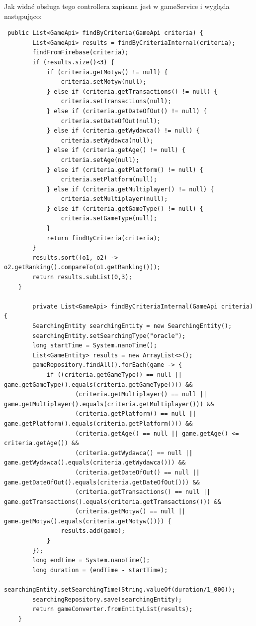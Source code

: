 Jak widać obsługa tego controllera zapisana jest w gameService i wygląda następująco:
\begin{lstlisting}
 public List<GameApi> findByCriteria(GameApi criteria) {
        List<GameApi> results = findByCriteriaInternal(criteria);
        findFromFirebase(criteria);
        if (results.size()<3) {
            if (criteria.getMotyw() != null) {
                criteria.setMotyw(null);
            } else if (criteria.getTransactions() != null) {
                criteria.setTransactions(null);
            } else if (criteria.getDateOfOut() != null) {
                criteria.setDateOfOut(null);
            } else if (criteria.getWydawca() != null) {
                criteria.setWydawca(null);
            } else if (criteria.getAge() != null) {
                criteria.setAge(null);
            } else if (criteria.getPlatform() != null) {
                criteria.setPlatform(null);
            } else if (criteria.getMultiplayer() != null) {
                criteria.setMultiplayer(null);
            } else if (criteria.getGameType() != null) {
                criteria.setGameType(null);
            }
            return findByCriteria(criteria);
        }
        results.sort((o1, o2) -> o2.getRanking().compareTo(o1.getRanking()));
        return results.subList(0,3);
    }
    
        private List<GameApi> findByCriteriaInternal(GameApi criteria) {
        SearchingEntity searchingEntity = new SearchingEntity();
        searchingEntity.setSearchingType("oracle");
        long startTime = System.nanoTime();
        List<GameEntity> results = new ArrayList<>();
        gameRepository.findAll().forEach(game -> {
            if ((criteria.getGameType() == null || game.getGameType().equals(criteria.getGameType())) &&
                    (criteria.getMultiplayer() == null || game.getMultiplayer().equals(criteria.getMultiplayer())) &&
                    (criteria.getPlatform() == null || game.getPlatform().equals(criteria.getPlatform())) &&
                    (criteria.getAge() == null || game.getAge() <= criteria.getAge()) &&
                    (criteria.getWydawca() == null || game.getWydawca().equals(criteria.getWydawca())) &&
                    (criteria.getDateOfOut() == null || game.getDateOfOut().equals(criteria.getDateOfOut())) &&
                    (criteria.getTransactions() == null || game.getTransactions().equals(criteria.getTransactions())) &&
                    (criteria.getMotyw() == null || game.getMotyw().equals(criteria.getMotyw()))) {
                results.add(game);
            }
        });
        long endTime = System.nanoTime();
        long duration = (endTime - startTime);
        searchingEntity.setSearchingTime(String.valueOf(duration/1_000));
        searchingRepository.save(searchingEntity);
        return gameConverter.fromEntityList(results);
    }


\end{lstlisting}
